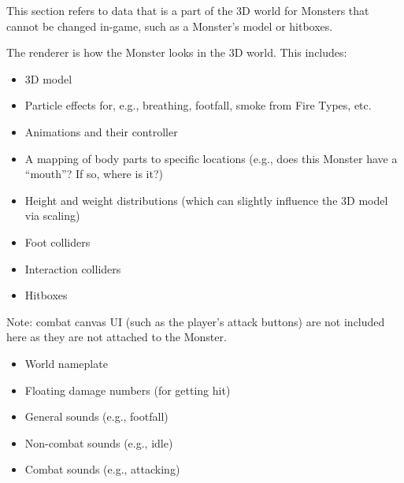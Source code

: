 
This section refers to data that is a part of the 3D world for Monsters that cannot be changed in-game, such as a Monster's model or hitboxes.

The renderer is how the Monster looks in the 3D world. This includes:
\begin{itemize}
	\item{3D model}
	\item{Particle effects for, e.g., breathing, footfall, smoke from Fire Types, etc.}
	\item{Animations and their controller}
	\item{A mapping of body parts to specific locations (e.g., does this Monster have a ``mouth''? If so, where is it?)}
	\item{Height and weight distributions (which can slightly influence the 3D model via scaling)}
\end{itemize}

\begin{itemize}
	\item{Foot colliders}
	\item{Interaction colliders}
	\item{Hitboxes}
\end{itemize}

Note: combat canvas UI (such as the player's attack buttons) are not included here as they are not attached to the Monster.
\begin{itemize}
	\item{World nameplate}
	\item{Floating damage numbers (for getting hit)}
\end{itemize}

\begin{itemize}
	\item{General sounds (e.g., footfall)}
	\item{Non-combat sounds (e.g., idle)}
	\item{Combat sounds (e.g., attacking)}
\end{itemize}

